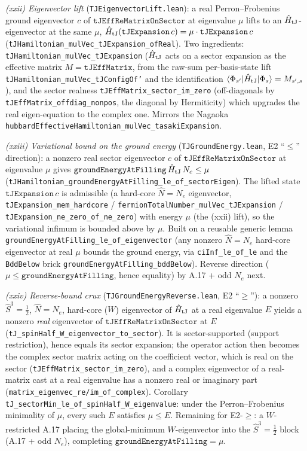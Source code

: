\documentclass[a4paper,11pt]{article}
\begin{document}
\emph{(xxii) Eigenvector lift} (\texttt{TJEigenvectorLift.lean}): a real Perron--Frobenius ground
eigenvector $c$ of $\texttt{tJEffReMatrixOnSector}$ at eigenvalue $\mu$ lifts to an
$\hat H_{\rm tJ}$-eigenvector at the same $\mu$,
$\hat H_{\rm tJ}(\texttt{tJExpansion}\,c)=\mu\cdot\texttt{tJExpansion}\,c$
(\texttt{tJHamiltonian\_mulVec\_tJExpansion\_ofReal}).  Two ingredients:
\texttt{tJHamiltonian\_mulVec\_tJExpansion} ($\hat H_{\rm tJ}$ acts on a sector expansion as the
effective matrix $M=\texttt{tJEffMatrix}$, from the raw-sum per-basis-state lift
\texttt{tJHamiltonian\_mulVec\_tJConfigOf'} and the identification
$\langle\Phi_{s'}|\hat H_{\rm tJ}|\Phi_s\rangle=M_{s',s}$), and the sector realness
\texttt{tJEffMatrix\_sector\_im\_zero} (off-diagonals by \texttt{tJEffMatrix\_offdiag\_nonpos}, the
diagonal by Hermiticity) which upgrades the real eigen-equation to the complex one.  Mirrors the
Nagaoka \texttt{hubbardEffectiveHamiltonian\_mulVec\_tasakiExpansion}.

\emph{(xxiii) Variational bound on the ground energy} (\texttt{TJGroundEnergy.lean}, E2 ``$\le$''
direction): a nonzero real sector eigenvector $c$ of $\texttt{tJEffReMatrixOnSector}$ at eigenvalue
$\mu$ gives $\texttt{groundEnergyAtFilling}\,\hat H_{\rm tJ}\,N_e \le \mu$
(\texttt{tJHamiltonian\_groundEnergyAtFilling\_le\_of\_sectorEigen}).  The lifted state
$\texttt{tJExpansion}\,c$ is admissible (a hard-core $\hat N=N_e$ eigenvector,
\texttt{tJExpansion\_mem\_hardcore} / \texttt{fermionTotalNumber\_mulVec\_tJExpansion} /
\texttt{tJExpansion\_ne\_zero\_of\_ne\_zero}) with energy $\mu$ (the (xxii) lift), so the
variational infimum is bounded above by $\mu$.  Built on a reusable generic lemma
\texttt{groundEnergyAtFilling\_le\_of\_eigenvector} (any nonzero $\hat N=N_e$ hard-core eigenvector
at real $\mu$ bounds the ground energy, via \texttt{ciInf\_le\_of\_le} and the \texttt{BddBelow}
brick \texttt{groundEnergyAtFilling\_bddBelow}).  Reverse direction ($\mu \le
\texttt{groundEnergyAtFilling}$, hence equality) by A.17 + odd $N_e$ next.

\emph{(xxiv) Reverse-bound crux} (\texttt{TJGroundEnergyReverse.lean}, E2 ``$\ge$''): a nonzero
$\hat S^3=\tfrac12$, $\hat N=N_e$, hard-core ($W$) eigenvector of $\hat H_{\rm tJ}$ at a real
eigenvalue $E$ yields a nonzero \emph{real} eigenvector of $\texttt{tJEffReMatrixOnSector}$ at $E$
(\texttt{tJ\_spinHalf\_W\_eigenvector\_to\_sector}).  It is sector-supported (support restriction),
hence equals its sector expansion; the operator action then becomes the complex sector matrix acting
on the coefficient vector, which is real on the sector (\texttt{tJEffMatrix\_sector\_im\_zero}), and
a complex eigenvector of a real-matrix cast at a real eigenvalue has a nonzero real or imaginary part
(\texttt{matrix\_eigenvec\_re/im\_of\_complex}).  Corollary
\texttt{tJ\_sectorMin\_le\_of\_spinHalf\_W\_eigenvalue}: under the Perron--Frobenius minimality of
$\mu$, every such $E$ satisfies $\mu \le E$.  Remaining for E2-$\ge$: a $W$-restricted A.17 placing
the global-minimum $W$-eigenvector into the $\hat S^3=\tfrac12$ block (A.17 + odd $N_e$), completing
$\texttt{groundEnergyAtFilling}=\mu$.
\end{document}
